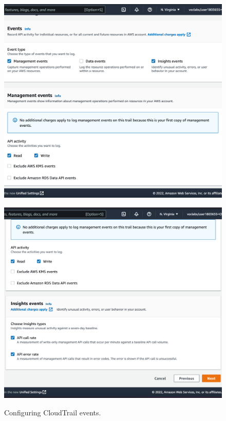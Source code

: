 \begin{figure}[!htbp]
    \centering
    \begin{minipage}{.5\textwidth}
        \centering
        \includegraphics[width=1\linewidth]{resources/cloudtrail/cloudtrail-events-1}
        \label{fig:cloudtrail-events-1}
    \end{minipage}%
    \begin{minipage}{.5\textwidth}
        \centering
        \includegraphics[width=1\linewidth]{resources/cloudtrail/cloudtrail-events-2}
        \label{fig:cloudtrail-events-2}
    \end{minipage}
    \caption{Configuring CloudTrail events.}
    \label{fig:cloudtrail-events}
\end{figure}

